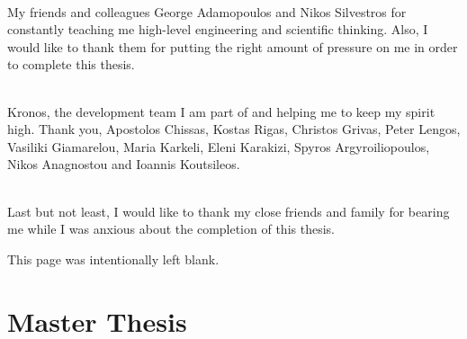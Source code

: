 \documentclass[12pt, a4paper]{report}
\begin{document}
\paragraph{} My friends and colleagues George Adamopoulos and Nikos Silvestros for constantly teaching me high-level engineering and scientific thinking. Also, I would like to thank them for putting the right amount of pressure on me in order to complete this thesis.

\paragraph{} Kronos, the development team I am part of and helping me to keep my spirit high. Thank you, Apostolos Chissas, Kostas Rigas, Christos Grivas, Peter Lengos, Vasiliki Giamarelou, Maria Karkeli, Eleni Karakizi, Spyros Argyroiliopoulos, Nikos Anagnostou and Ioannis Koutsileos. 

\paragraph{} Last but not least, I would like to thank my close friends and family for bearing me while I was anxious about the completion of this thesis.

\newpage
\begin{center}
This page was intentionally left blank.
\end{center}

\newpage
{}
\part{Master Thesis}





\newpage



\end{document}
